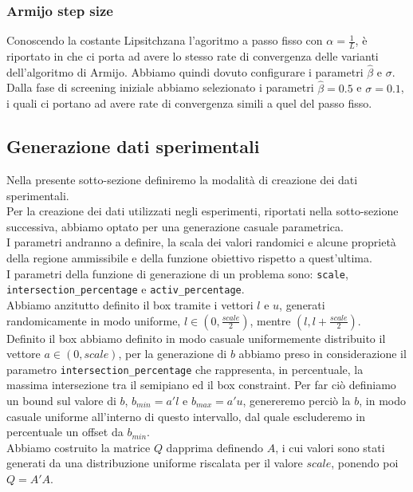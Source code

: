 \documentclass{article}
\begin{document}
\subsubsection{Armijo step size}
Conoscendo la costante  Lipsitchzana l'agoritmo a passo fisso con $\alpha = \frac{1}{L}$, è riportato in \cite{gafni1982convergence} che  ci porta ad avere lo stesso rate di convergenza delle varianti dell'algoritmo di Armijo. Abbiamo quindi dovuto configurare i parametri $\hat{\beta}$ e $\sigma$. Dalla fase di screening iniziale abbiamo selezionato i parametri $\hat{\beta}= 0.5$ e $\sigma = 0.1$, i quali ci portano ad avere rate di convergenza simili a quel del passo fisso.
\subsection{Generazione dati sperimentali}
Nella presente sotto-sezione definiremo la modalità di creazione dei dati sperimentali.\\
Per la creazione dei dati utilizzati negli esperimenti, riportati nella sotto-sezione successiva, abbiamo optato per una generazione casuale parametrica.\\
I parametri andranno a definire, la scala dei valori randomici e alcune proprietà della regione ammissibile e della funzione obiettivo rispetto a quest'ultima.\\
I parametri della funzione di generazione di un problema sono: \texttt{scale},\\
\texttt{intersection\_percentage} e \texttt{activ\_percentage}.\\
Abbiamo anzitutto definito il box tramite i vettori $l$ e $u$, generati randomicamente in modo uniforme, $l \in  (0, \frac{scale}{2})$, mentre $(l, l + \frac{scale}{2})$.\\
Definito il box abbiamo definito in modo casuale uniformemente distribuito il vettore $a \in (0, scale)$, per la generazione di $b$ abbiamo preso in considerazione il parametro \texttt{intersection\_percentage} che rappresenta, in percentuale, la massima intersezione tra il semipiano ed il box constraint. Per far ciò definiamo un bound sul valore di $b$, $b_{min} = a'l$ e $b_{max} = a'u$, genereremo perciò la $b$, in modo casuale uniforme all'interno di questo intervallo, dal quale escluderemo in percentuale un offset da $b_{min}$.\\
Abbiamo costruito la matrice $Q$ dapprima definendo $A$, i cui valori sono stati generati da una distribuzione uniforme riscalata per il valore $scale$, ponendo poi $Q = A'A$.\\
\end{document}
